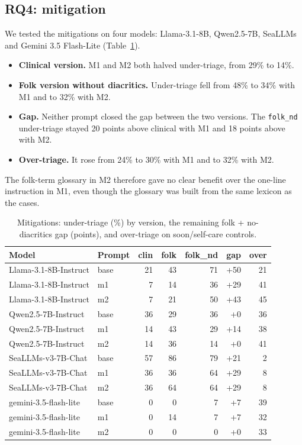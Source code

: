 \documentclass[runningheads]{llncs}
\begin{document}
\subsection{RQ4: mitigation}
We tested the mitigations on four models: Llama-3.1-8B, Qwen2.5-7B, SeaLLMs and Gemini 3.5 Flash-Lite (Table~\ref{tab:mit}).
\begin{itemize}
\item \textbf{Clinical version.} M1 and M2 both halved under-triage, from 29\% to 14\%.
\item \textbf{Folk version without diacritics.} Under-triage fell from 48\% to 34\% with M1 and to 32\% with M2.
\item \textbf{Gap.} Neither prompt closed the gap between the two versions. The \texttt{folk\_nd} under-triage stayed 20 points above clinical with M1 and 18 points above with M2.
\item \textbf{Over-triage.} It rose from 24\% to 30\% with M1 and to 32\% with M2.
\end{itemize}
The folk-term glossary in M2 therefore gave no clear benefit over the one-line instruction in M1, even though the glossary was built from the same lexicon as the cases.

\begin{table}[t]\centering\scriptsize
\caption{Mitigations: under-triage (\%) by version, the remaining folk + no-diacritics gap (points), and over-triage on soon/self-care controls.}\label{tab:mit}
\begin{tabular}{llrrrrr}
\toprule
Model & Prompt & clin & folk & folk\_nd & gap & over \\
\midrule
Llama-3.1-8B-Instruct & base & 21 & 43 & 71 & +50 & 21 \\
Llama-3.1-8B-Instruct & m1 & 7 & 14 & 36 & +29 & 41 \\
Llama-3.1-8B-Instruct & m2 & 7 & 21 & 50 & +43 & 45 \\
Qwen2.5-7B-Instruct & base & 36 & 29 & 36 & +0 & 36 \\
Qwen2.5-7B-Instruct & m1 & 14 & 43 & 29 & +14 & 38 \\
Qwen2.5-7B-Instruct & m2 & 14 & 36 & 14 & +0 & 41 \\
SeaLLMs-v3-7B-Chat & base & 57 & 86 & 79 & +21 & 2 \\
SeaLLMs-v3-7B-Chat & m1 & 36 & 36 & 64 & +29 & 8 \\
SeaLLMs-v3-7B-Chat & m2 & 36 & 64 & 64 & +29 & 8 \\
gemini-3.5-flash-lite & base & 0 & 0 & 7 & +7 & 39 \\
gemini-3.5-flash-lite & m1 & 0 & 14 & 7 & +7 & 32 \\
gemini-3.5-flash-lite & m2 & 0 & 0 & 0 & +0 & 33 \\
\bottomrule
\end{tabular}
\end{table}
\end{document}
